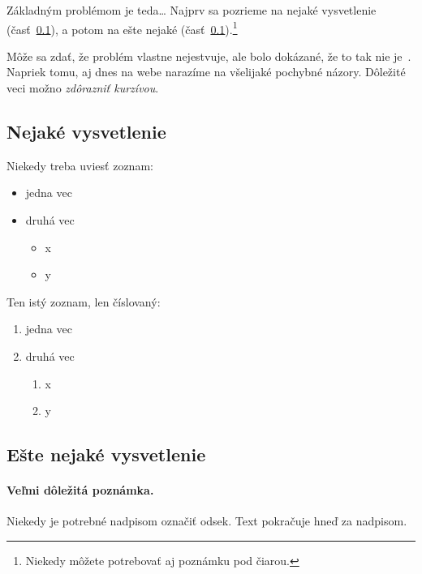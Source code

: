 \documentclass[10pt,twoside,slovak,a4paper]{coursepaper}
\begin{document}

Základným problémom je teda\ldots{} Najprv sa pozrieme na nejaké vysvetlenie (časť~\ref{ina:nejake}), a potom na ešte nejaké (časť~\ref{ina:nejake}).\footnote{Niekedy môžete potrebovať aj poznámku pod čiarou.}

Môže sa zdať, že problém vlastne nejestvuje\cite{Coplien:MPD}, ale bolo dokázané, že to tak nie je~\cite{Czarnecki:Staged, Czarnecki:Progress}. Napriek tomu, aj dnes na webe narazíme na všelijaké pochybné názory\cite{PLP-Framework}. Dôležité veci možno \emph{zdôrazniť kurzívou}.


\subsection{Nejaké vysvetlenie} \label{ina:nejake}

Niekedy treba uviesť zoznam:

\begin{itemize}
\item jedna vec
\item druhá vec
	\begin{itemize}
	\item x
	\item y
	\end{itemize}
\end{itemize}

Ten istý zoznam, len číslovaný:

\begin{enumerate}
\item jedna vec
\item druhá vec
	\begin{enumerate}
	\item x
	\item y
	\end{enumerate}
\end{enumerate}


\subsection{Ešte nejaké vysvetlenie} \label{ina:este}

\paragraph{Veľmi dôležitá poznámka.}
Niekedy je potrebné nadpisom označiť odsek. Text pokračuje hneď za nadpisom.
\end{document}
